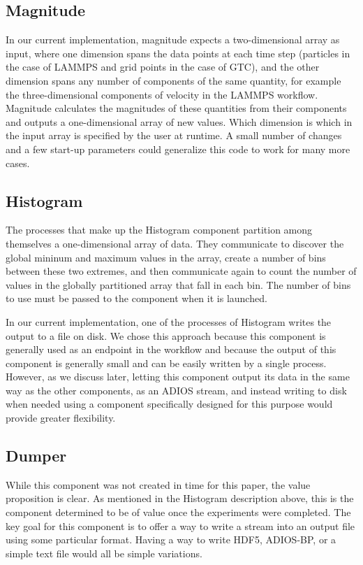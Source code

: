 \documentclass[conference]{IEEEtran}
\begin{document}
\subsection{Magnitude}

In our current implementation, magnitude expects a two-dimensional array as
input, where one dimension spans the data points at each time step (particles
in the case of LAMMPS and grid points in the case of GTC), and the other
dimension spans any number of components of the same quantity, for example the
three-dimensional components of velocity in the LAMMPS workflow. Magnitude
calculates the magnitudes of these quantities from their components and outputs
a one-dimensional array of new values. Which dimension is which in the input
array is specified by the user at runtime. A small number of changes and a few
start-up parameters could generalize this code to work for many more cases.

\subsection{Histogram}

The processes that make up the Histogram component partition among themselves
a one-dimensional array of data. They communicate to discover the global
mininum and maximum values in the array, create a number of bins between these
two extremes, and then communicate again to count the number of values in the
globally partitioned array that fall in each bin. The number of bins to use
must be passed to the component when it is launched.

In our current implementation, one of the processes of Histogram writes the
output to a file on disk. We chose this approach because this component is
generally used as an endpoint in the workflow and because the output of this
component is generally small and can be easily written by a single process.
However, as we discuss later, letting this component output its data in the
same way as the other components, as an ADIOS stream, and instead writing to
disk when needed using a component specifically designed for this purpose would
provide greater flexibility.

\subsection{Dumper}

While this component was not created in time for this paper, the value
proposition is clear. As mentioned in the Histogram description above, this is
the component determined to be of value once the experiments were completed.
The key goal for this component is to offer a way to write a stream into an
output file using some particular format. Having a way to write HDF5, ADIOS-BP,
or a simple text file would all be simple variations.
\end{document}
